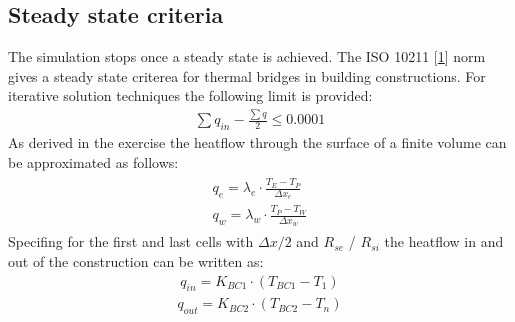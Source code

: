 \documentclass[letterpaper,10pt,english]{jupyterBook}
\begin{document}
\subsection{Steady state criteria}
\label{\detokenize{Aufgabe1:steady-state-criteria}}
\sphinxAtStartPar
The simulation stops once a steady state is achieved. The ISO 10211 {[}\hyperlink{cite.Aufgabe1:id8}{1}{]} norm gives a steady state criterea for thermal bridges in building constructions. For iterative solution techniques the following limit is provided:
\begin{equation}\label{equation:Aufgabe1:label}
\begin{split} \sum q_{in} - \frac{\sum q}{2} \le 0.0001 \end{split}
\end{equation}
\sphinxAtStartPar
As derived in the exercise the heatflow through the surface of a finite volume can be approximated as follows:
\begin{equation}\label{equation:Aufgabe1:flows}
\begin{split}\begin{align}
q_{e} = \lambda_e \cdot \frac{T_E-T_P}{\Delta x_e} \\
q_{w} = \lambda_w \cdot \frac{T_P-T_W}{\Delta x_w}
\end{align}\end{split}
\end{equation}
\sphinxAtStartPar
Specifing for the first and last cells with \(\Delta x /2\) and \(R_{se}\) / \(R_{si}\) the heatflow in and out of the construction can be written as:
\begin{equation}\label{equation:Aufgabe1:label}
\begin{split} q_{in} = K_{BC1} \cdot (T_{BC1}-T_{1}) \end{split}
\end{equation}\begin{equation}\label{equation:Aufgabe1:label}
\begin{split} q_{out} = K_{BC2} \cdot (T_{BC2}-T_{n}) \end{split}
\end{equation}
\end{document}
